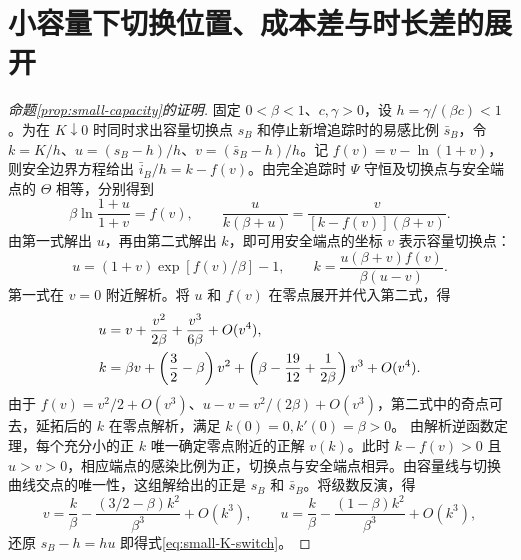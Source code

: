\documentclass[lang=cn,a4paper,newtx]{elegantpaper}
\theoremstyle{plain}
\theoremstyle{definition}
\begin{document}
\section{小容量下切换位置、成本差与时长差的展开}
\label{app:small-capacity-proof}
\begin{proof}[命题\ref{prop:small-capacity}的证明]
固定 $0<\beta<1$、$c,\gamma>0$，设 $h=\gamma/(\beta c)<1$。为在 $K\downarrow0$ 时同时求出容量切换点 $s_B$ 和停止新增追踪时的易感比例 $\bar s_B$，令 $k=K/h$、$u=(s_B-h)/h$、$v=(\bar s_B-h)/h$。记 $f(v)=v-\ln(1+v)$，则安全边界方程给出 $\bar i_B/h=k-f(v)$。由完全追踪时 $\Psi$ 守恒及切换点与安全端点的 $\Theta$ 相等，分别得到
\begin{equation}
 \beta\ln\frac{1+u}{1+v}=f(v),\qquad
 \frac{u}{k(\beta+u)}=
 \frac{v}{[k-f(v)](\beta+v)}.
 \label{eq:small-K-endpoint-match}
\end{equation}
由第一式解出 $u$，再由第二式解出 $k$，即可用安全端点的坐标 $v$ 表示容量切换点：
\begin{equation}
 u=(1+v)\exp[f(v)/\beta]-1,\qquad
 k=\frac{u(\beta+v)f(v)}{\beta(u-v)}.
 \label{eq:small-K-parametrization}
\end{equation}
第一式在 $v=0$ 附近解析。将 $u$ 和 $f(v)$ 在零点展开并代入第二式，得
\begin{align}
 u&=v+\frac{v^2}{2\beta}+\frac{v^3}{6\beta}+O(v^4),\notag\\
 k&=\beta v+\left(\frac32-\beta\right)v^2
   +\left(\beta-\frac{19}{12}+\frac1{2\beta}\right)v^3+O(v^4).
 \label{eq:small-K-param-series}
\end{align}
由于 $f(v)=v^2/2+O(v^3)$、$u-v=v^2/(2\beta)+O(v^3)$，第二式中的奇点可去，延拓后的 $k$ 在零点解析，满足 $k(0)=0,k'(0)=\beta>0$。
由解析逆函数定理，每个充分小的正 $k$ 唯一确定零点附近的正解 $v(k)$。此时 $k-f(v)>0$ 且 $u>v>0$，相应端点的感染比例为正，切换点与安全端点相异。由容量线与切换曲线交点的唯一性，这组解给出的正是 $s_B$ 和 $\bar s_B$。将级数反演，得
\begin{equation}
 v=\frac k\beta-\frac{(3/2-\beta)k^2}{\beta^3}+O(k^3),\qquad
 u=\frac k\beta-\frac{(1-\beta)k^2}{\beta^3}+O(k^3),
 \label{eq:small-K-inverse}
\end{equation}
还原 $s_B-h=hu$ 即得式\eqref{eq:small-K-switch}。


\end{proof}
\end{document}
